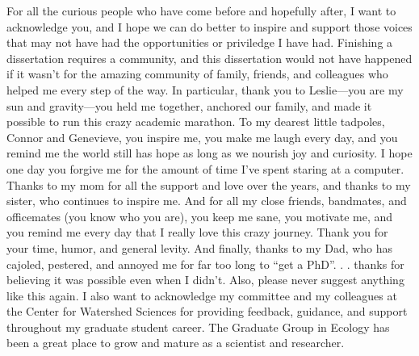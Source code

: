 \documentclass[twoside,12pt,final]{ucthesis-CA2012} %
\begin{document}
\begin{ucfrontmatter}
\begin{dedication}
\begin{center}
\begin{Large}
      \end{Large}
      \end{center}
  \end{dedication}
  \begin{acknowledgements}
    For all the curious people who have come before and hopefully after, I
    want to acknowledge you, and I hope we can do better to inspire and
    support those voices that may not have had the opportunities or
    priviledge I have had. Finishing a dissertation requires a community,
    and this dissertation would not have happened if it wasn't for the
    amazing community of family, friends, and colleagues who helped me every
    step of the way. In particular, thank you to Leslie---you are my sun and
    gravity---you held me together, anchored our family, and made it
    possible to run this crazy academic marathon. To my dearest little
    tadpoles, Connor and Genevieve, you inspire me, you make me laugh every
    day, and you remind me the world still has hope as long as we nourish
    joy and curiosity. I hope one day you forgive me for the amount of time
    I've spent staring at a computer. Thanks to my mom for all the support
    and love over the years, and thanks to my sister, who continues to
    inspire me. And for all my close friends, bandmates, and officemates
    (you know who you are), you keep me sane, you motivate me, and you
    remind me every day that I really love this crazy journey. Thank you for
    your time, humor, and general levity. And finally, thanks to my Dad, who
    has cajoled, pestered, and annoyed me for far too long to ``get a PhD''.
    . . thanks for believing it was possible even when I didn't. Also,
    please never suggest anything like this again. I also want to
    acknowledge my committee and my colleagues at the Center for Watershed
    Sciences for providing feedback, guidance, and support throughout my
    graduate student career. The Graduate Group in Ecology has been a great
    place to grow and mature as a scientist and researcher.
  \end{acknowledgements}

  \begin{abstract}


\end{abstract}
\end{ucfrontmatter}
\end{document}
